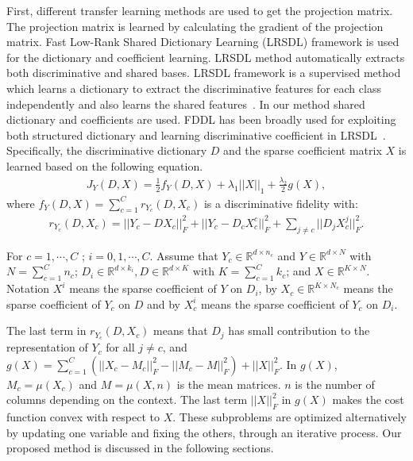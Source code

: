 First, different transfer learning methods are used to get the projection matrix. The projection matrix is learned by calculating the gradient of the projection matrix. Fast Low-Rank Shared Dictionary Learning (LRSDL) framework is used for the dictionary and coefficient learning. LRSDL method automatically extracts both discriminative and shared bases. LRSDL framework is a supervised method which learns a dictionary to extract the discriminative features for each class independently and also learns the shared features~\cite{7987024}. In our method shared dictionary and coefficients are used. FDDL has been broadly used for exploiting both structured dictionary and learning discriminative coefficient in LRSDL~\cite{612628612}. Specifically, the discriminative dictionary $D$ and the sparse coefficient matrix $X$ is learned based on the following equation.
\begin{equation}
\begin{aligned}
	J_Y(D,X) = \frac{1}{2}f_Y(D,X) + \lambda_1||X||_1 + \frac{\lambda_2}{2}g(X),
\end{aligned}
\label{eq:DL}
\end{equation}
where $f_Y(D,X) =  \sum\limits_{c=1}^{C} r_{Y_c}(D,X_c)$ is a discriminative fidelity with:
\begin{equation}
\begin{aligned}
r_{Y_c}(D,X_c) = ||Y_c-DX_c||_F^2 + ||Y_c - D_cX_c^c||_F^2 + \sum\limits_{j\neq c}||D_jX_c^j||_F^2.
\end{aligned}
\end{equation}

For $c = 1, \cdots,C$ ; $i =0,1,\cdots, C$. Assume that $Y_c \in \mathbb{R}^{d\times n_c}$ and $Y \in \mathbb{R}^{d \times N}$ with $N = \sum_{c=1}^{C}n_c$; $D_i \in \mathbb{R}^{d\times k_i} , D \in \mathbb{R}^{d\times K}\text{ with } K = \sum_{c=1}^{C}k_c $; and $X \in \mathbb{R}^{K \times N}$. Notation $X^i$ means the sparse coefficient of $Y$ on $D_i$, by $X_c \in \mathbb{R}^{K \times N_c}$ means the sparse coefficient of $Y_c$ on $D$ and by $X_c^i$ means the sparse coefficient of $Y_c$ on $D_i$.  

The last term in $r_{Y_c}(D,X_c)$ means that $D_j$ has small contribution to the representation of $Y_c$ for all $j\neq c$, and $g(X) = \sum_{c=1}^{C}(||X_c - M_c||_F^2 - ||M_c - M||_F^2) + ||X||_F^2 $. In $g(X)$, 
$M_c = \mu(X_c)$ and $M = \mu(X,n)$ is the mean matrices. $n$ is the number of columns depending on the context. The last term $||X||_F^2$ in $g(X)$ makes the cost function convex with respect to $X$. These subproblems are optimized alternatively by updating one variable and fixing the others, through an iterative process. Our proposed method is discussed in the following sections.

